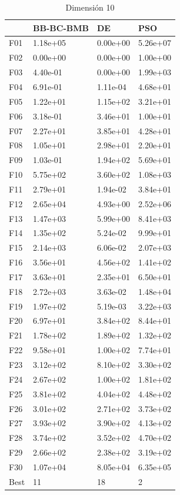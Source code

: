 \begin{table}[H]
    \begin{minipage}{.5\linewidth}
      \caption{Dimensión 10}
      \centering
      \begin{tabular}{llll}
        \toprule
        {} & BB-BC-BMB &        DE &       PSO \\
        \midrule
        F01  &  1.18e+05 &  0.00e+00 &  5.26e+07 \\
        F02  &  0.00e+00 &  0.00e+00 &  1.00e+00 \\
        F03  &  4.40e-01 &  0.00e+00 &  1.99e+03 \\
        F04  &  6.91e-01 &  1.11e-04 &  4.68e+01 \\
        F05  &  1.22e+01 &  1.15e+02 &  3.21e+01 \\
        F06  &  3.18e-01 &  3.46e+01 &  1.00e+01 \\
        F07  &  2.27e+01 &  3.85e+01 &  4.28e+01 \\
        F08  &  1.05e+01 &  2.98e+01 &  2.20e+01 \\
        F09  &  1.03e-01 &  1.94e+02 &  5.69e+01 \\
        F10  &  5.75e+02 &  3.60e+02 &  1.08e+03 \\
        F11  &  2.79e+01 &  1.94e-02 &  3.84e+01 \\
        F12  &  2.65e+04 &  4.93e+00 &  2.52e+06 \\
        F13  &  1.47e+03 &  5.99e+00 &  8.41e+03 \\
        F14  &  1.35e+02 &  5.24e-02 &  9.99e+01 \\
        F15  &  2.14e+03 &  6.06e-02 &  2.07e+03 \\
        F16  &  3.56e+01 &  4.56e+02 &  1.41e+02 \\
        F17  &  3.63e+01 &  2.35e+01 &  6.50e+01 \\
        F18  &  2.72e+03 &  3.63e-02 &  1.48e+04 \\
        F19  &  1.97e+02 &  5.19e-03 &  3.22e+03 \\
        F20  &  6.97e+01 &  3.84e+02 &  8.44e+01 \\
        F21  &  1.78e+02 &  1.89e+02 &  1.32e+02 \\
        F22  &  9.58e+01 &  1.00e+02 &  7.74e+01 \\
        F23  &  3.12e+02 &  8.10e+02 &  3.30e+02 \\
        F24  &  2.67e+02 &  1.00e+02 &  1.81e+02 \\
        F25  &  3.81e+02 &  4.04e+02 &  4.48e+02 \\
        F26  &  3.01e+02 &  2.71e+02 &  3.73e+02 \\
        F27  &  3.93e+02 &  3.90e+02 &  4.13e+02 \\
        F28  &  3.74e+02 &  3.52e+02 &  4.70e+02 \\
        F29  &  2.66e+02 &  2.38e+02 &  3.19e+02 \\
        F30  &  1.07e+04 &  8.05e+04 &  6.35e+05 \\
        Best &        11 &        18 &         2 \\
        \bottomrule
        \end{tabular}
        

\end{minipage}
\end{table}
